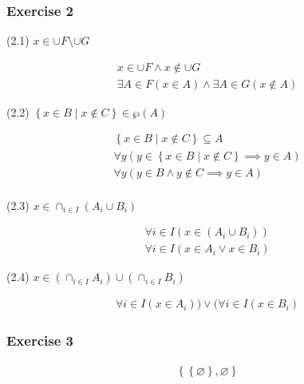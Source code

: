 \begin{questions}
\subsubsection{Exercise 2}
\begin{center}
(2.1) $x \in \cup F \setminus \cup G $
\end{center}
\begin{align*}
x \in \cup F \land x \notin \cup G \\
\exists A \in F(x \in A) \land \exists A \in G(x \notin A)
\end{align*}

\begin{center}
(2.2) $\left\{ x \in B \mid x \notin C\right\} \in \wp(A)$ 
\end{center}
\begin{align*}
\left\{ x \in B \mid x \notin C\right\} \subseteq A  \\
\forall y(y \in \left\{ x \in B \mid x \notin C\right\} \implies y \in A) \\
\forall y(y \in  B \land y \notin C \implies y \in A) \\
\end{align*}

\begin{center}
(2.3) $ x \in \cap_{i \in I}(A_i \cup B_i)$ 
\end{center}
\begin{align*}
\forall i \in I(x \in (A_i \cup B_i)) \\
\forall i \in I(x \in A_i \lor x \in B_i)
\end{align*}

\begin{center}
(2.4) $x \in (\cap_{i \in I}A_i) \cup (\cap_{i \in I}B_i)$ 
\end{center}
\begin{align*}
\forall i \in I(x \in A_i)) \lor (\forall i \in I(x \in B_i)
\end{align*}

\subsubsection{Exercise 3}
\begin{align*}
  \left\{\left\{\varnothing\right\}, \varnothing \right\}
\end{align*}


\end{questions}
